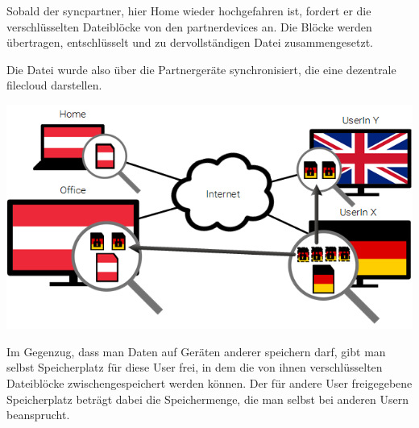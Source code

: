 Sobald der \gls{syncpartner}, hier Home wieder hochgefahren ist, fordert er die
verschlüsselten Dateiblöcke von den \glspl{partnerdevice} an. Die Blöcke werden
übertragen, entschlüsselt und zu dervollständigen Datei zusammengesetzt.

Die Datei wurde also über die Partnergeräte synchronisiert, die eine dezentrale
\gls{filecloud} darstellen.

\includegraphics[]{images/sblit_3}

Im Gegenzug, dass man Daten auf Geräten anderer speichern darf, gibt man selbst
Speicherplatz für diese User frei, in dem die von ihnen verschlüsselten
Dateiblöcke zwischengespeichert werden können. Der für andere User freigegebene
Speicherplatz beträgt dabei die Speichermenge, die man selbst bei anderen Usern
beansprucht.
